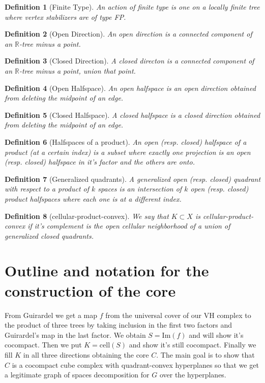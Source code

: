 \documentclass{article}
\theoremstyle{mystyle}
\newtheorem{defn}{Definition}
\theoremstyle{remark}
\begin{document}
\begin{defn}
	[Finite Type] 
	An action of {\em finite type} is one on a locally finite tree where  vertex stabilizers are of type FP.
\end{defn}

\begin{defn}[Open Direction] An open direction is a connected component of an \(\mathbb{R}\)-tree minus a point. 
\end{defn}

\begin{defn}[Closed Direction] A closed directon is a connected component of an \(\mathbb{R}\)-tree minus a point, union that point.
\end{defn}
\begin{defn}[Open Halfspace] An open halfspace is an open direction obtained from deleting the midpoint of an edge.
\end{defn}
\begin{defn}[Closed Halfspace] A closed halfspace is a closed direction obtained from deleting the midpoint of an edge.
\end{defn}
\begin{defn}[Halfspaces of a product] An open (resp. closed) halfspace of a product (at a certain index) is a subset where exactly one projection is an open (resp. closed)  halfspace in it's factor and the others are onto.
\end{defn}
\begin{defn}[Generalized quadrants] A generalized open (resp. closed) quadrant with respect to a product of \(k\) spaces is an intersection of \(k\) open (resp. closed) product halfspaces where each one is at a different index.
\end{defn}
\begin{defn}[cellular-product-convex] We say that \(K \subset X\) is cellular-product-convex if it's complement is the open cellular neighborhood of a union of generalized closed quadrants.
\end{defn}



\section{Outline and notation for the construction of the core}

    From Guirardel we get a map \(f\) from the universal cover of our VH complex to the product of three trees by taking inclusion in the first two factors and Guirardel's map in the last factor. We obtain \(S = \text{Im}(f)\) and will show it's cocompact. Then we put \(K = \text{cell}{(S)}\) and show it's still cocompact. Finally we fill \(K\) in all three directions obtaining the core \(C\). The main goal is to show that \(C\) is a cocompact cube complex with quadrant-convex hyperplanes so that we get a legitimate graph of spaces decomposition for \(G\) over the hyperplanes.
\end{document}
